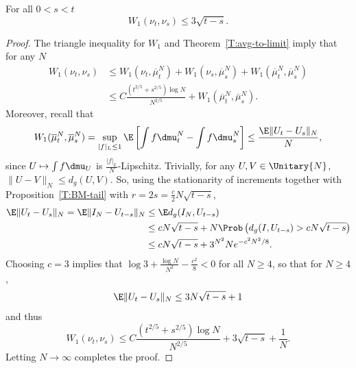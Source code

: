 \begin{lemm}\label{T:nu-continuity}
For all $0<s<t$
\[
W_1(\nu_t,\nu_s)\le 3\sqrt{t-s}.
\]
\end{lemm}

\begin{proof}
The triangle inequality for $W_1$ and Theorem~\ref{T:avg-to-limit} imply that for any $N$
\begin{align*}
W_1(\nu_t,\nu_s)
&\le W_1(\nu_t,\overline{\mu}^N_t)+ W_1(\nu_s,\overline{\mu}^N_s)+ W_1(\overline{\mu}^N_t,\overline{\mu}^N_s)\\
&\le C\frac{(t^{2/5}+s^{2/5})\log N}{N^{2/5}}+W_1(\overline{\mu}^N_t,\overline{\mu}^N_s).
\end{align*}
Moreover, recall that
\[
W_1(\overline{\mu}^N_t,\overline{\mu}^N_s)=\sup_{|f|_L\le 1}\E\left[\int f\dmu_t^N-\int f\dmu^N_s\right]\le\frac{\E\|U_t-U_s\|_N}{N},
\]
since $U\mapsto\int f\dmu_U$ is $\frac{|f|_L}{N}$-Lipschitz. Trivially, for any $U,V\in\Unitary{N}$, $\|U-V\|_N\le d_g(U,V)$. So, using the stationarity of increments together with Proposition~\ref{T:BM-tail} with $r=2s=\frac{c}{2}N\sqrt{t-s}$,
\begin{align*}
\E\|U_t-U_s\|_N=\E\|I_N-U_{t-s}\|_N &\le \E d_g(I_N,U_{t-s})\\
&\le cN\sqrt{t-s}+N\Prob\left(d_g(I,U_{t-s})>cN\sqrt{t-s}\right)\\
&\le cN\sqrt{t-s}+3^{N^2}Ne^{-c^2N^2/8}.
\end{align*}
Choosing $c=3$ implies that $\log3+\frac{\log N}{N^2}-\frac{c^2}{8}<0$ for all $N\ge 4$, so that for $N\ge 4$,
\[
\E\|U_t-U_s\|_N\le 3N\sqrt{t-s}+1
\]
and thus
\[
W_1(\nu_t,\nu_s)\le C\frac{(t^{2/5}+s^{2/5})\log N}{N^{2/5}} + 3\sqrt{t-s}+\frac{1}{N}.
\]
Letting $N\to\infty$ completes the proof.
\end{proof}


